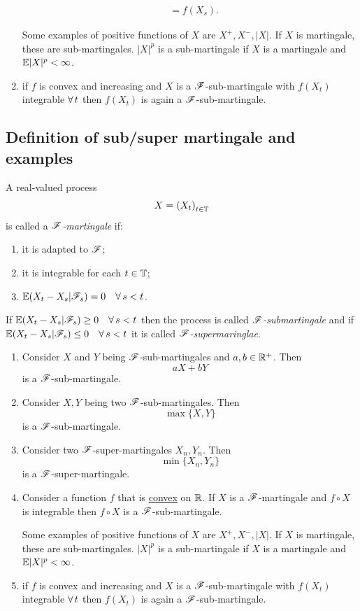 \documentclass{report}
\begin{document}
\begin{enumerate}
\begin{fancyproof}
\begin{align*}
			&=f(X_s).
		\end{align*}
	\end{fancyproof}
	\begin{remark}
		Some examples of positive functions of $X$ are $X^{+},X^{-},|X|$. If $X$ is martingale, these are sub-martingales.  $|X|^{p}$ is a sub-martingale if $X$ is a martingale and $\mathbb{E}|X|^{p}<\infty$.
	\end{remark}
	\item if $f$ is convex and increasing and $X$ is a $\mathscr{F}$-sub-martingale with $f(X_{t})$ integrable $\forall\, t$ then $f(X_{t})$ is again a $\mathscr{F}$-sub-martingale.
\end{enumerate}
\subsection{Definition of sub/super martingale and examples}
\begin{definition}
	A real-valued process
	\[X={(X_t)}_{t\in\mathbb{T}}\]
	is called a \emph{$\mathscr{F}$-martingale} if:
	\begin{enumerate}
		\item it is adapted to $\mathscr{F}$;
		\item it is integrable for each $t\in\mathbb{T}$;
		\item $\mathbb{E}(X_t-X_s|\mathscr{F}_s)=0\quad\forall\, s<t$.
	\end{enumerate}
	If $\mathbb{E}(X_t-X_s|\mathscr{F}_s)\geq0\quad\forall\, s<t$ then the process is called \emph{$\mathscr{F}$-submartingale} and if $\mathbb{E}(X_t-X_s|\mathscr{F}_s)\leq0\quad\forall\, s<t$ it is called \emph{$\mathscr{F}$-supermaringlae}.
\end{definition}
\begin{enumerate}
	\item Consider $X$ and $Y$ being $\mathscr{F}$-sub-martingales and $a,b\in\mathbb{R}^{+}$. Then 
	\[aX+bY\]
	is a $\mathscr{F}$-sub-martingale.
	\item Consider $X,Y$ being two $\mathscr{F}$-sub-martingales. Then
	\[\max\{X,Y\}\]
	is a $\mathscr{F}$-sub-martingale.
	\item Consider two $\mathscr{F}$-super-martingales $X_{n},Y_{n}$. Then
	\[\min\{X_{n},Y_{n}\}\]
	is a $\mathscr{F}$-super-martingale.
	\item Consider a function $f$ that is \underline{convex} on $\mathbb{R}$. If $X$ is a $\mathscr{F}$-martingale and $f\circ X$ is integrable then $f\circ X$ is a $\mathscr{F}$-sub-martingale.
	\begin{remark}
		Some examples of positive functions of $X$ are $X^{+},X^{-},|X|$. If $X$ is martingale, these are sub-martingales.  $|X|^{p}$ is a sub-martingale if $X$ is a martingale and $\mathbb{E}|X|^{p}<\infty$.
	\end{remark}
	\item if $f$ is convex and increasing and $X$ is a $\mathscr{F}$-sub-martingale with $f(X_{t})$ integrable $\forall\, t$ then $f(X_{t})$ is again a $\mathscr{F}$-sub-martingale.
\end{enumerate}
\end{document}

